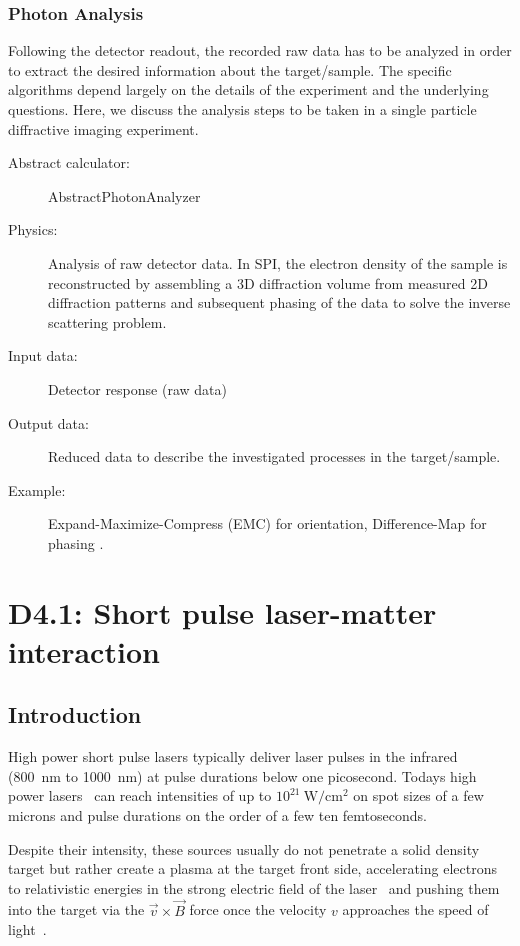 \documentclass[a4paper]{article}
\begin{document}
\subsubsection{Photon Analysis}
Following the detector readout, the recorded raw data has to be analyzed in order to extract the desired information about the target/sample. The
specific algorithms depend largely on the details of the experiment and the underlying questions. Here, we discuss the analysis steps to be taken
in a single particle diffractive imaging experiment.
\begin{description}
  \item[Abstract calculator:] AbstractPhotonAnalyzer
  \item[Physics:]  Analysis of raw detector data. In SPI, the electron density of the sample is reconstructed by assembling a 3D diffraction volume
    from measured 2D diffraction patterns and subsequent phasing of the data to solve the inverse scattering problem.
  \item[Input data:] Detector response (raw data)
  \item[Output data:] Reduced data to describe the investigated processes in the target/sample.
  \item[Example:]  Expand-Maximize-Compress (EMC)  for orientation, Difference-Map for phasing \cite{Loh2009, s2e_recon_bitbucket}.
\end{description}

\section{D4.1: Short pulse laser-matter interaction\label{sec:short_pulse}}
%
\subsection{Introduction}
High power short pulse lasers typically deliver laser pulses in the infrared (800~nm to 1000~nm) at pulse durations below one picosecond. Todays high power lasers~\cite{Siebold2008} can reach intensities of up to $10^{21}~\text{W}/\text{cm}^2$ on spot sizes of a few microns and pulse durations on the order of a few ten femtoseconds.

Despite their intensity, these sources usually do not penetrate a solid density target but rather create a plasma at the target front side, accelerating electrons to relativistic energies in the strong electric field of the laser~\cite{Kluge2011} and pushing them into the target via the $\vec{v}\times\vec{B}$ force once the velocity $v$ approaches the speed of light~\cite{Mulser2010,Gibbon1996}.
\end{document}
